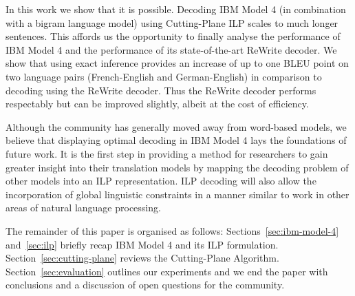 In this work we show that it is possible.  Decoding IBM Model 4 (in
combination with a bigram language model) using Cutting-Plane ILP
scales to much longer sentences.  This affords us the opportunity to
finally analyse the performance of IBM Model 4 and the performance of
its state-of-the-art ReWrite decoder.  We show that using exact
inference provides an increase of up to one BLEU point on two language
pairs (French-English and German-English) in comparison to decoding
using the ReWrite decoder.  Thus the ReWrite decoder performs
respectably but can be improved slightly, albeit at the cost of
efficiency.

Although the community has generally moved away from word-based
models, we believe that displaying optimal decoding in IBM Model 4
lays the foundations of future work.  It is the first step in
providing a method for researchers to gain greater insight into their
translation models by mapping the decoding problem of other models
into an ILP representation.  ILP decoding will also allow the
incorporation of global linguistic constraints in a manner similar to
work in other areas of natural language processing.

The remainder of this paper is organised as follows:
Sections~\ref{sec:ibm-model-4} and~\ref{sec:ilp} briefly recap IBM
Model 4 and its ILP formulation.  Section~\ref{sec:cutting-plane}
reviews the Cutting-Plane Algorithm.  Section~\ref{sec:evaluation}
outlines our experiments and we end the paper with conclusions and a
discussion of open questions for the community.



